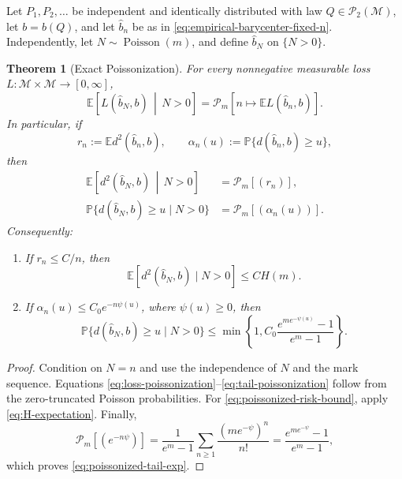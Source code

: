\documentclass[11pt,a4paper]{article}
\newtheorem{theorem}{Theorem}[section]
\theoremstyle{remark}
\newcommand{\M}{\mathcal M}
\newcommand{\EE}{\mathbb E}
\newcommand{\PP}{\mathbb P}
\begin{document}
Let \(P_1,P_2,\ldots\) be independent and identically distributed with law \(Q\in\mathcal P_2(\M)\), let \(b=b(Q)\), and let \(\widehat b_n\) be as in \eqref{eq:empirical-barycenter-fixed-n}.  Independently, let \(N\sim\operatorname{Poisson}(m)\), and define \(\widehat b_N\) on \(\{N>0\}\).

\begin{theorem}[Exact Poissonization]
\label{thm:poissonization}
For every nonnegative measurable loss \(L:\M\times\M\to[0,\infty]\),
\begin{equation}
\label{eq:loss-poissonization}
 \EE\!\left[L(\widehat b_N,b)\,\middle|\,N>0\right]
 =\mathscr P_m\!\left[
 n\mapsto\EE L(\widehat b_n,b)
 \right].
\end{equation}
In particular, if
\[
 r_n:=\EE d^2(\widehat b_n,b),
 \qquad
 \alpha_n(u):=\PP\{d(\widehat b_n,b)\ge u\},
\]
then
\begin{align}
\label{eq:risk-poissonization}
 \EE\!\left[d^2(\widehat b_N,b)\,\middle|\,N>0\right]
 &=\mathscr P_m[(r_n)],\\
\label{eq:tail-poissonization}
 \PP\{d(\widehat b_N,b)\ge u\mid N>0\}
 &=\mathscr P_m[(\alpha_n(u))].
\end{align}
Consequently:
\begin{enumerate}[label=(\roman*)]
\item If \(r_n\le C/n\), then
\begin{equation}
\label{eq:poissonized-risk-bound}
 \EE[d^2(\widehat b_N,b)\mid N>0]\le C H(m).
\end{equation}
\item If \(\alpha_n(u)\le C_0e^{-n\psi(u)}\), where \(\psi(u)\ge0\), then
\begin{equation}
\label{eq:poissonized-tail-exp}
 \PP\{d(\widehat b_N,b)\ge u\mid N>0\}
 \le \min\!\left\{1,
 C_0\frac{e^{m e^{-\psi(u)}}-1}{e^m-1}
 \right\}.
\end{equation}
\end{enumerate}
\end{theorem}

\begin{proof}
Condition on \(N=n\) and use the independence of \(N\) and the mark sequence.  Equations \eqref{eq:loss-poissonization}--\eqref{eq:tail-poissonization} follow from the zero-truncated Poisson probabilities.  For \eqref{eq:poissonized-risk-bound}, apply \eqref{eq:H-expectation}.  Finally,
\[
 \mathscr P_m[(e^{-n\psi})]
 =\frac{1}{e^m-1}\sum_{n\ge1}\frac{(me^{-\psi})^n}{n!}
 =\frac{e^{m e^{-\psi}}-1}{e^m-1},
\]
which proves \eqref{eq:poissonized-tail-exp}.
\end{proof}
\end{document}

